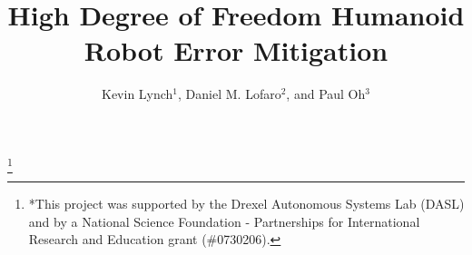 \documentclass[fleqn,10pt,twocolumn]{ICCAS2012}
\begin{document}
\title{High Degree of Freedom Humanoid Robot Error Mitigation}

\author{Kevin Lynch${}^{1}$, Daniel M. Lofaro${}^{2}$, and Paul Oh${}^{3}$ }

\thanks{*This project was supported by the Drexel Autonomous Systems Lab (DASL) and by a National Science Foundation - Partnerships for International Research and Education grant (\#0730206).}%
\abstract{

}


\maketitle





 



%


%
%


%
{}



%
\end{document}
